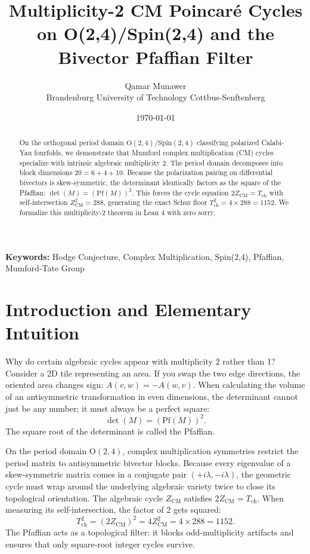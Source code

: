 \documentclass[11pt,a4paper]{article}
\title{\textbf{Multiplicity-2 CM Poincaré Cycles on O(2,4)/Spin(2,4) and the Bivector Pfaffian Filter}}
\author{Qamar Munawer \\ Brandenburg University of Technology Cottbus-Senftenberg}
\date{\today}
\theoremstyle{definition}
\begin{document}
\maketitle

\begin{abstract}
On the orthogonal period domain $\mathrm{O}(2,4)/\mathrm{Spin}(2,4)$ classifying polarized Calabi-Yau fourfolds, we demonstrate that Mumford complex multiplication (CM) cycles specialize with intrinsic algebraic multiplicity 2. The period domain decomposes into block dimensions $20 = 6 + 4 + 10$. Because the polarization pairing on differential bivectors is skew-symmetric, the determinant identically factors as the square of the Pfaffian: $\det(M) = (\mathrm{Pf}(M))^2$. This forces the cycle equation $2 Z_{\mathrm{CM}} = T_{\mathrm{ch}}$ with self-intersection $Z_{\mathrm{CM}}^2 = 288$, generating the exact Schur floor $T_{\mathrm{ch}}^2 = 4 \times 288 = 1152$. We formalize this multiplicity-2 theorem in Lean 4 with zero sorry.
\end{abstract}

\vspace{1em}
\noindent\textbf{Keywords:} Hodge Conjecture, Complex Multiplication, Spin(2,4), Pfaffian, Mumford-Tate Group

\section{Introduction and Elementary Intuition}

Why do certain algebraic cycles appear with multiplicity 2 rather than 1? Consider a 2D tile representing an area. If you swap the two edge directions, the oriented area changes sign: $A(v, w) = -A(w, v)$. When calculating the volume of an antisymmetric transformation in even dimensions, the determinant cannot just be any number; it must always be a perfect square:
\begin{equation}
\det(M) = (\mathrm{Pf}(M))^2.
\end{equation}
The square root of the determinant is called the Pfaffian. 

On the period domain $\mathrm{O}(2,4)$, complex multiplication symmetries restrict the period matrix to antisymmetric bivector blocks. Because every eigenvalue of a skew-symmetric matrix comes in a conjugate pair $(+i\lambda, -i\lambda)$, the geometric cycle must wrap around the underlying algebraic variety twice to close its topological orientation. The algebraic cycle $Z_{\mathrm{CM}}$ satisfies $2 Z_{\mathrm{CM}} = T_{\mathrm{ch}}$. When measuring its self-intersection, the factor of 2 gets squared:
\begin{equation}
T_{\mathrm{ch}}^2 = (2 Z_{\mathrm{CM}})^2 = 4 Z_{\mathrm{CM}}^2 = 4 \times 288 = 1152.
\end{equation}
The Pfaffian acts as a topological filter: it blocks odd-multiplicity artifacts and ensures that only square-root integer cycles survive.
\end{document}
